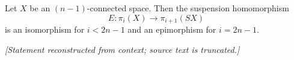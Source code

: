 Let $X$ be an $(n-1)$-connected space. Then the suspension homomorphism
$$E: \pi_i(X) \to \pi_{i+1}(SX)$$
is an isomorphism for $i < 2n-1$ and an epimorphism for $i = 2n-1$.

\textit{[Statement reconstructed from context; source text is truncated.]}

